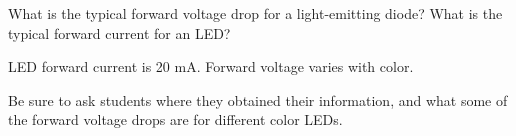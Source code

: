 

What is the typical forward voltage drop for a light-emitting diode?  What is the typical forward current for an LED?







LED forward current is 20 mA.  Forward voltage varies with color.







Be sure to ask students where they obtained their information, and what some of the forward voltage drops are for different color LEDs.





